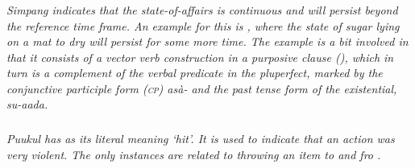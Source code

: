 % 



\subsubsection{}\label{sec:wc:simpang}
\em Simpang \em indicates that the state-of-affairs is continuous and will persist beyond the reference time frame. An example for this is , where the state of sugar lying on a mat to dry will persist for some more time. The example is a bit involved in that it consists of a vector verb construction in a purposive clause (), which in turn is a complement of the verbal predicate   in the pluperfect, marked by the conjunctive participle form (\textsc{cp}) \em asà- \em and the past tense form of the existential, \em su-aada\em.





\subsubsection{}\label{sec:wc:puukul}
\em Puukul \em has as its literal meaning `hit'. It is used to indicate that an action was very violent. The only instances are related to throwing an item to  and fro .


